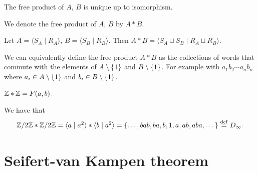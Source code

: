 \documentclass[11pt,a4paper]{article}
\begin{document}
\begin{proposition}
  The free product of $A$, $B$ is unique up to isomorphism.
\end{proposition}

\begin{remark}
  We denote the free product of $A$, $B$ by $A * B$.
\end{remark}

\begin{proposition}
  Let $A = \langle S_A \mid R_A \rangle$, $B = \langle S_B \mid R_B \rangle$.
  Then $A * B = \langle S_A \sqcup S_B \mid R_A \sqcup R_B \rangle$.
\end{proposition}

\begin{remark}
  We can equivalently define the free product $A * B$ as
  the collections of words that commute with the elements of
  $A \setminus \left\{1\right\}$ and $B \setminus \left\{1\right\}$.
  For example with $a_1 b_2 \cdots a_n b_n$ where
  $a_i \in A \setminus \left\{1\right\}$ and $b_i \in B \setminus \left\{1\right\}$.
\end{remark}

\begin{example}
  $\mathbb{Z} * \mathbb{Z} = F(a,b)$.
\end{example}

\begin{example}
  We have that
  \[
    \mathbb{Z} / 2\mathbb{Z} * \mathbb{Z} / 2\mathbb{Z} =
    \langle a \mid a^2 \rangle * \langle b \mid a^2 \rangle =
    \left\{\dots,bab,ba,b,1,a,ab,aba,\dots\right\} \overset{\mathrm{def}}{=}
    D_{\infty}.
  \]
\end{example}

\newpage

\section{Seifert-van Kampen theorem}
\end{document}
